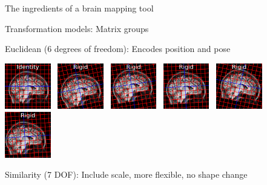 \documentclass{beamer}
\begin{document}
\begin{frame}{The ingredients of a brain mapping tool}
\end{frame}


\begin{frame}{Transformation models: Matrix groups}

Euclidean (6 degrees of freedom): Encodes position and pose

\includegraphics[width=0.15\textwidth]{tform_models_id}~
\includegraphics[width=0.15\textwidth]{tform_models_rigid_1}~
\includegraphics[width=0.15\textwidth]{tform_models_rigid_2}~
\includegraphics[width=0.15\textwidth]{tform_models_rigid_3}~
\includegraphics[width=0.15\textwidth]{tform_models_rigid_4}~
\includegraphics[width=0.15\textwidth]{tform_models_rigid_5}




Similarity (7 DOF): Include scale, more flexible, no shape change



\end{frame}
\end{document}
